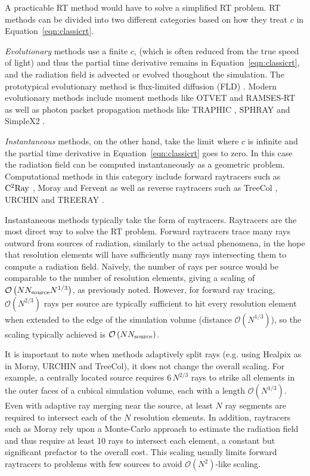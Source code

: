 \documentclass[fleq,usenatbib]{mnras}
\newcommand{\bigO}[1]{\mathcal{O}\left(#1\right)}
\newcommand{\NS}{N_{\rm source}}
\begin{document}
A practicable RT method would have to solve a simplified RT problem. RT 
methods can be divided into two different categories based on how they treat 
$c$ in Equation~\ref{eqn:classicrt}.

\textit{Evolutionary} methods use a 
finite $c$, (which is often reduced from the true speed of light) and thus the 
partial time derivative remains in Equation~\ref{eqn:classicrt}, and the 
radiation field is advected or evolved thoughout the simulation. The 
prototypical evolutionary method is flux-limited diffusion (FLD) 
\citep{levermorePomraning81}. Modern evolutionary methods include moment 
methods like OTVET \citep{gnedinAbel01} and RAMSES-RT \citep{rosdahlEt13} as 
well as photon packet propagation methods like TRAPHIC \citep{pawlikSchaye08}, 
SPHRAY \citep{altayEt08} and SimpleX2 \citep{paardekooperEt10}.

\textit{Instantaneous} methods, on the other hand, take the limit where $c$ 
is infinite and the partial time derivative in Equation~\ref{eqn:classicrt} 
goes to zero. In this case the radiation field can be computed instantaneously 
as a geometric problem. Computational methods in this category include forward 
raytracers such as $\rm C^2Ray$ \citep{mellemaEt06a}, Moray 
\citep{wiseAbel11} and Fervent \citep{baczynskiEt15} as well as reverse 
raytracers such as TreeCol \citep{clarkEt12}, URCHIN \citep{altayTheuns13} 
and TREERAY \citep{HaidEt18}. 

Instantaneous methods typically take the form of raytracers. Raytracers are 
the most direct way to solve the RT problem. Forward raytracers trace many 
rays outward from sources of radiation, similarly to the actual phenomena, in 
the hope that resolution elements will have sufficiently many rays 
intersecting them to compute a radiation field. Na\"ively, the number of rays 
per source would be comparable to the number of resolution elements, giving a 
scaling of $\bigO{N \NS N^{1/3}}$, as previously noted. However, for forward 
ray tracing, $\bigO{N^{2/3}}$ rays per source are typically sufficient to hit 
every resolution element when extended to the edge of the simulation volume 
(distance $\bigO{N^{1/3}}$), so the scaling typically achieved is 
$\bigO{N \NS}$.  

It is important to note when methods adaptively split rays (e.g. using 
Healpix \citealt{gorskiEt05} as in Moray, URCHIN and TreeCol), it does not 
change the overall scaling. For example, a centrally located source requires 
$6\, N^{2/3}$ rays to strike all elements in the outer faces of a cubical 
simulation volume, each with a length $\bigO{N^{1/3}}$. Even with adaptive ray 
merging near the source, at least $N$ ray segments are required to intersect 
each of the $N$ resolution elements. In addition, raytracers such as Moray 
rely upon a Monte-Carlo approach to estimate the radiation field and thus 
require at least 10 rays to intersect each element, a constant but 
significant prefactor to the overall cost. This scaling usually limits 
forward raytracers to problems with few sources to avoid 
$\mathcal{O}(N^2)$-like scaling. 
\end{document}
